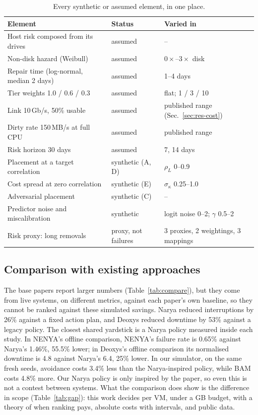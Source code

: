 \documentclass[pdflatex,sn-mathphys-num,iicol]{sn-jnl}
\theoremstyle{thmstyleone}%
\theoremstyle{thmstylethree}%
\begin{document}


\begin{table}[!t]\centering
\caption{Every synthetic or assumed element, in one place.}\label{tab:assumed}
\setlength{\tabcolsep}{4pt}\footnotesize
\begin{tabular}{lll}\toprule
Element & Status & Varied in \\ \midrule
Host risk composed from its drives & assumed & -- \\
Non-disk hazard (Weibull) & assumed & $0\times$--$3\times$ disk \\
Repair time (log-normal, median 2 days) & assumed & 1--4 days \\
Tier weights 1.0 / 0.6 / 0.3 & assumed & flat; 1 / 3 / 10 \\
Link 10\,Gb/s, 50\% usable & assumed & published range (Sec.~\ref{sec:res-cost}) \\
Dirty rate 150\,MB/s at full CPU & assumed & published range \\
Risk horizon 30 days & assumed & 7, 14 days \\
Placement at a target correlation & synthetic (A, D) & $\rho_L$ 0--0.9 \\
Cost spread at zero correlation & synthetic (E) & $\sigma_\kappa$ 0.25--1.0 \\
Adversarial placement & synthetic (C) & -- \\
Predictor noise and miscalibration & synthetic & logit noise 0--2; $\gamma$ 0.5--2 \\
Risk proxy: long removals & proxy, not failures & 3 proxies, 2 weightings, 3 mappings \\
\bottomrule\end{tabular}
\end{table}

\subsection{Comparison with existing approaches}\label{sec:res-compare}

The base papers report larger numbers (Table~\ref{tab:compare}), but they come from live systems,
on different metrics, against each paper's own baseline, so they cannot be ranked against these
simulated savings. Narya reduced interruptions by 26\% against a fixed action plan, and Deoxys
reduced downtime by 53\% against a legacy policy. The closest shared yardstick is a Narya policy
measured inside each study. In NENYA's offline comparison, NENYA's failure rate is 0.65\% against
Narya's 1.46\%, 55.5\% lower; in Deoxys's offline comparison its normalised downtime is 4.8
against Narya's 6.4, 25\% lower. In our simulator, on the same fresh seeds, avoidance costs 3.4\%
less than the Narya-inspired policy, while BAM costs 4.8\% more. Our Narya policy is only
inspired by the paper, so even this is not a contest between systems. What the comparison does
show is the difference in scope (Table~\ref{tab:gap}): this work decides per VM, under a GB budget,
with a theory of when ranking pays, absolute costs with intervals, and public data.
\end{document}
